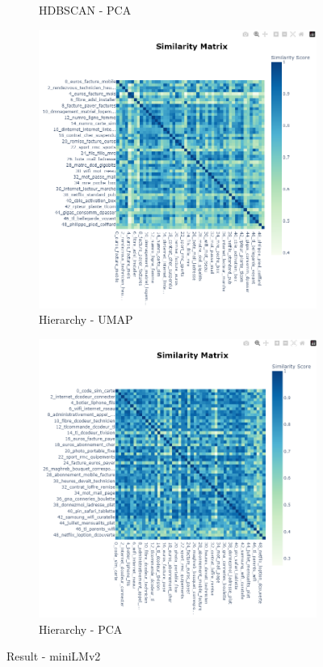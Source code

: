 \begin{figure}[H]
\begin{subfigure}{0.45\textwidth}
        \caption{HDBSCAN - PCA}
    \end{subfigure}
    \begin{subfigure}{0.45\textwidth}
        \includegraphics[width=\linewidth]{images/results/mini/hierachy_umap.png}
        \caption{Hierarchy - UMAP}
    \end{subfigure}
    \begin{subfigure}{0.45\textwidth}
        \includegraphics[width=\linewidth]{images/results/mini/hierachy_pca.png}
        \caption{Hierarchy - PCA}
    \end{subfigure}

    
    \caption{Result - miniLMv2}
    \label{fig:result_mini}
\end{figure}


